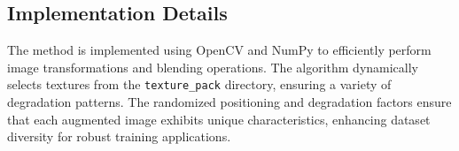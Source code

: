 \subsection{Implementation Details}

The method is implemented using OpenCV and NumPy to efficiently perform image transformations and blending operations. The algorithm dynamically selects textures from the \texttt{texture\_pack} directory, ensuring a variety of degradation patterns. The randomized positioning and degradation factors ensure that each augmented image exhibits unique characteristics, enhancing dataset diversity for robust training applications.
